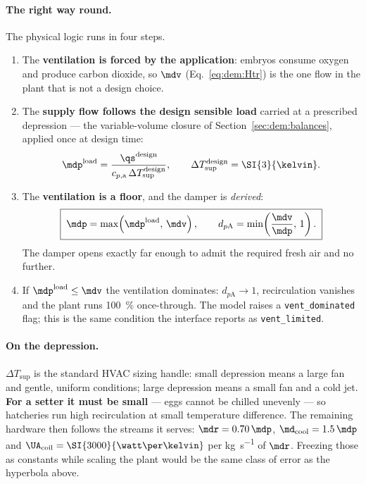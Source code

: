 \paragraph{The right way round.} The physical logic runs in four steps.
\begin{enumerate}[nosep]
\item The \textbf{ventilation is forced by the application}: embryos consume
oxygen and produce carbon dioxide, so $\mdv$ (Eq.~\eqref{eq:dem:Htr}) is the one
flow in the plant that is not a design choice.
\item The \textbf{supply flow follows the design sensible load} carried at a
prescribed depression --- the variable-volume closure of
Section~\ref{sec:dem:balances}, applied once at design time:
\begin{equation}
\mdp^{\mathrm{load}}=\frac{\qs^{\mathrm{design}}}
{c_{p,\mathrm{a}}\,\Delta T_{\mathrm{sup}}^{\mathrm{design}}},
\qquad \Delta T_{\mathrm{sup}}^{\mathrm{design}}=\SI{3}{\kelvin}.
\label{eq:dem:mdotload}
\end{equation}
\item The \textbf{ventilation is a floor}, and the damper is \emph{derived}:
\begin{equation}
\boxed{\;\mdp=\max\!\left(\mdp^{\mathrm{load}},\,\mdv\right),\qquad
d_{p\mathrm{A}}=\min\!\left(\frac{\mdv}{\mdp},\,1\right).\;}
\label{eq:dem:causality}
\end{equation}
The damper opens exactly far enough to admit the required fresh air and no
further.
\item If $\mdp^{\mathrm{load}}\le\mdv$ the ventilation dominates:
$d_{p\mathrm{A}}\to1$, recirculation vanishes and the plant runs
\SI{100}{\percent} once-through. The model raises a \verb|vent_dominated| flag;
this is the same condition the interface reports as \verb|vent_limited|.
\end{enumerate}

\paragraph{On the depression.} $\Delta T_{\mathrm{sup}}$ is the standard HVAC
sizing handle: small depression means a large fan and gentle, uniform conditions;
large depression means a small fan and a cold jet. \textbf{For a setter it must
be small} --- eggs cannot be chilled unevenly --- so hatcheries run high
recirculation at small temperature difference. The remaining hardware then
follows the streams it serves:
$\mdr=0.70\,\mdp$, $\md_{\mathrm{cool}}=1.5\,\mdp$ and
$\UA_{\mathrm{coil}}=\SI{3000}{\watt\per\kelvin}$ per \si{\kilogram\per\second}
of $\mdr$. Freezing those as constants while scaling the plant would be the same
class of error as the hyperbola above.

